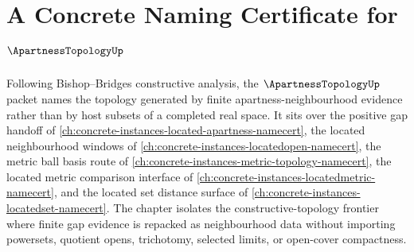 \chapter{A Concrete Naming Certificate for $\ApartnessTopologyUp$}
\label{ch:concrete-instances-apartnesstopology-namecert}

Following Bishop--Bridges constructive analysis, the $\ApartnessTopologyUp$ packet names the topology generated by finite apartness-neighbourhood evidence rather than by host subsets of a completed real space. It sits over the positive gap handoff of \autoref{ch:concrete-instances-located-apartness-namecert}, the located neighbourhood windows of \autoref{ch:concrete-instances-locatedopen-namecert}, the metric ball basis route of \autoref{ch:concrete-instances-metric-topology-namecert}, the located metric comparison interface of \autoref{ch:concrete-instances-locatedmetric-namecert}, and the located set distance surface of \autoref{ch:concrete-instances-locatedset-namecert}. The chapter isolates the constructive-topology frontier where finite gap evidence is repacked as neighbourhood data without importing powersets, quotient opens, trichotomy, selected limits, or open-cover compactness.

